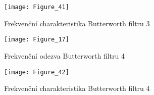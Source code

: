 \begin{figure}[H] 
	\centering
	\texttt{[image: Figure\_41]}
	\caption{Frekvenční charakteristika Butterworth filtru 3}
\end{figure}

\begin{figure}[H] 
	\centering
	\texttt{[image: Figure\_17]}
	\caption{Frekvenční odezva Butterworth filtru 4}
\end{figure}

\begin{figure}[H] 
	\centering
	\texttt{[image: Figure\_42]}
	\caption{Frekvenční charakteristika Butterworth filtru 4}
\end{figure}